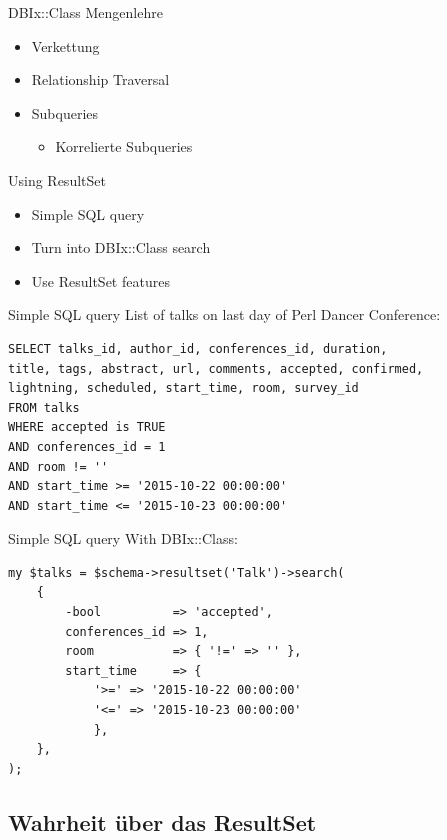 \begin{frame}{DBIx::Class Mengenlehre}
\begin{itemize}
\item Verkettung
\item Relationship Traversal
\item Subqueries
  \begin{itemize}
    \item Korrelierte Subqueries
  \end{itemize}
\end{itemize}
\end{frame}

\begin{frame}{Using ResultSet}
\begin{itemize}
\item Simple SQL query
\item Turn into DBIx::Class search
\item Use ResultSet features
\end{itemize}
\end{frame}

\begin{frame}[fragile]{Simple SQL query}
List of talks on last day of Perl Dancer Conference:
\begin{lstlisting}
SELECT talks_id, author_id, conferences_id, duration,
title, tags, abstract, url, comments, accepted, confirmed, 
lightning, scheduled, start_time, room, survey_id 
FROM talks 
WHERE accepted is TRUE 
AND conferences_id = 1 
AND room != '' 
AND start_time >= '2015-10-22 00:00:00'
AND start_time <= '2015-10-23 00:00:00'
\end{lstlisting}
\end{frame}

\begin{frame}[fragile]{Simple SQL query}
With DBIx::Class:
\begin{lstlisting}
my $talks = $schema->resultset('Talk')->search(
    {
        -bool          => 'accepted',
        conferences_id => 1,
        room           => { '!=' => '' },
        start_time     => {
            '>=' => '2015-10-22 00:00:00'
            '<=' => '2015-10-23 00:00:00'
            },
    },
);
\end{lstlisting}
\end{frame}

\subsection{Wahrheit über das ResultSet}

